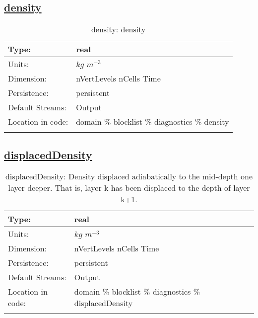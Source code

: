 \subsection[density]{\hyperref[sec:var_tab_diagnostics]{density}}
\label{subsec:var_sec_diagnostics_density}
\begin{center}
\begin{longtable}{| p{2.0in} | p{4.0in} |}
        \hline 
        Type: & real \\
        \hline 
        Units: & $kg$ $m^{-3}$ \\
        \hline 
        Dimension: & nVertLevels nCells Time \\
        \hline 
        Persistence: & persistent \\
        \hline 
		 Default Streams: & Output  \\
        \hline 
		 Location in code: & domain \% blocklist \% diagnostics \% density \\
		 \hline 
    \caption{density: density}
\end{longtable}
\end{center}
\subsection[displacedDensity]{\hyperref[sec:var_tab_diagnostics]{displacedDensity}}
\label{subsec:var_sec_diagnostics_displacedDensity}
\begin{center}
\begin{longtable}{| p{2.0in} | p{4.0in} |}
        \hline 
        Type: & real \\
        \hline 
        Units: & $kg$ $m^{-3}$ \\
        \hline 
        Dimension: & nVertLevels nCells Time \\
        \hline 
        Persistence: & persistent \\
        \hline 
		 Default Streams: & Output  \\
        \hline 
		 Location in code: & domain \% blocklist \% diagnostics \% displacedDensity \\
		 \hline 
    \caption{displacedDensity: Density displaced adiabatically to the mid-depth one layer deeper.  That is, layer k has been displaced to the depth of layer k+1.}
\end{longtable}
\end{center}

